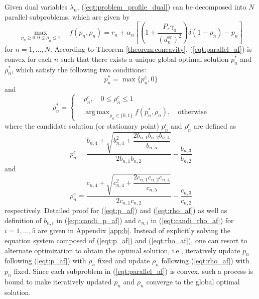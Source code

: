 \documentclass[12pt, draftclsnofoot, onecolumn]{IEEEtran}
\DeclareMathOperator*{\argmax}{arg\,max}
\begin{document}
Given dual variables $\lambda_{n}$, (\ref{eqt:problem_profile_dual}) can be decomposed into $N$ parallel subproblems, which are given by
\begin{equation}\label{eqt:parallel_af}
\max\limits_{p_{n}\geq 0,0\leq\rho_{n}\leq 1}\quad f(p_{n},\rho_{n})=r_{n}+\alpha_{n}[(1+\dfrac{P_{s}\gamma_{0}}{(d^{sr}_{n})^{2}})\delta(1-\rho_{n})-p_{n}]
\end{equation}
for $n=1,...,N$.
According to Theorem \ref{theorem:concavity}, (\ref{eqt:parallel_af}) is convex for each $n$ such that there exists a unique global optimal solution $p^{*}_{n}$ and $\rho^{*}_{n}$, which satisfy the following two conditions:
\begin{equation}\label{eqt:p_af}
p^{*}_{n}=\max\{p^{c}_{n},0\}
\end{equation}
and
\begin{equation}\label{eqt:rho_af}
\rho^{*}_{n}=\left\{
\begin{aligned}
&\rho^{c}_{n},\quad 0\leq\rho^{c}_{n}\leq 1\\
&\mathop{\argmax}_{\rho_{n}\in\{0,1\}}f(p^{*}_{n},\rho_{n}),\quad\text{otherwise}
\end{aligned}
\right.
\end{equation}
where the candidate solution (or stationary point) $p^{c}_{n}$ and $\rho^{c}_{n}$ are defined as
\begin{equation}\label{eqt:candi_p_af}
p^{c}_{n}=\dfrac{b_{n,4}+\sqrt{b_{n,4}^{2}+\dfrac{2b_{n,1}b_{n,2}b_{n,4}}{b_{n,5}}}}{2b_{n,1}b_{n,2}}-\dfrac{b_{n,3}}{b_{n,2}}
\end{equation}
and 
\begin{equation}\label{eqt:candi_rho_af}
\rho^{c}_{n}=\dfrac{c_{n,4}+\sqrt{c_{n,4}^{2}+\dfrac{2c_{n,1}c_{n,2}c_{n,4}}{c_{n,5}}}}{2c_{n,1}c_{n,2}}-\dfrac{c_{n,3}}{c_{n,2}}
\end{equation}
respectively. Detailed proof for (\ref{eqt:p_af}) and (\ref{eqt:rho_af}) as well as definition of $b_{n,i}$ in (\ref{eqt:candi_p_af}) and $c_{n,i}$ in (\ref{eqt:candi_rho_af}) for $i=1,...,5$ are given in Appendix \ref{app:b}. Instead of explicitly solving the equation system composed of (\ref{eqt:p_af}) and (\ref{eqt:rho_af}), one can resort to alternate optimization to obtain the optimal solution, i.e., iteratively update $p_{n}$ following (\ref{eqt:p_af}) with $\rho_{n}$ fixed and update $\rho_{n}$ following (\ref{eqt:rho_af}) with $p_{n}$ fixed. Since each subproblem in (\ref{eqt:parallel_af}) is convex, such a process is bound to make iteratively updated $p_{n}$ and $\rho_{n}$ converge to the global optimal solution.
\end{document}
